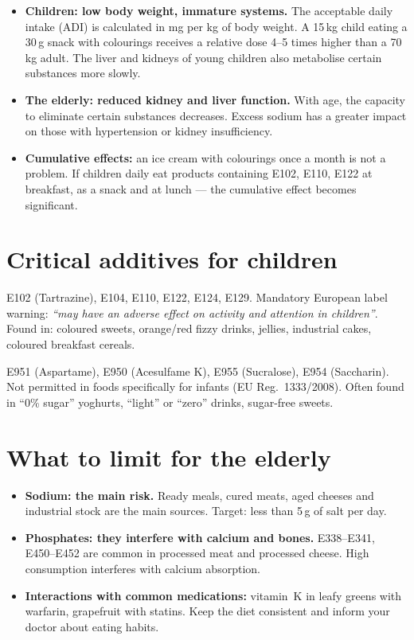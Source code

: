 \documentclass[a5paper,12pt,oneside,openany]{book}
\newcommand{\boxyellow}[2]{%
  \begin{tcolorbox}[boxbase,
    colback=warnyellow!12!white, colframe=warnyellow!80!black, title={#1}]
  #2\end{tcolorbox}}
\newcommand{\boxred}[2]{%
  \begin{tcolorbox}[boxbase,
    colback=warnred!8!white, colframe=warnred, title={#1}]
  #2\end{tcolorbox}}
\begin{document}
\begin{itemize}
  \item \textbf{Children: low body weight, immature systems.} The
    acceptable daily intake (ADI) is calculated in mg per kg of body
    weight. A 15\,kg child eating a 30\,g snack with colourings receives
    a relative dose 4--5 times higher than a 70\,kg adult. The liver and
    kidneys of young children also metabolise certain substances more
    slowly.
  \item \textbf{The elderly: reduced kidney and liver function.} With
    age, the capacity to eliminate certain substances decreases. Excess
    sodium has a greater impact on those with hypertension or kidney
    insufficiency.
  \item \textbf{Cumulative effects:} an ice cream with colourings once
    a month is not a problem. If children daily eat products containing
    E102, E110, E122 at breakfast, as a snack and at lunch --- the
    cumulative effect becomes significant.
\end{itemize}

\section{Critical additives for children}

\boxred{Azo dyes --- avoid with children}{E102 (Tartrazine), E104,
E110, E122, E124, E129. Mandatory European label warning: \emph{``may
have an adverse effect on activity and attention in children''}. Found in:
coloured sweets, orange/red fizzy drinks, jellies, industrial cakes,
coloured breakfast cereals.}

\boxyellow{Intense sweeteners --- not approved for young children}{E951
(Aspartame), E950 (Acesulfame K), E955 (Sucralose), E954 (Saccharin).
Not permitted in foods specifically for infants (EU Reg.~1333/2008).
Often found in ``0\% sugar'' yoghurts, ``light'' or ``zero'' drinks,
sugar-free sweets.}

\section{What to limit for the elderly}

\begin{itemize}
  \item \textbf{Sodium: the main risk.} Ready meals, cured meats, aged
    cheeses and industrial stock are the main sources. Target: less than
    5\,g of salt per day.
  \item \textbf{Phosphates: they interfere with calcium and bones.}
    E338--E341, E450--E452 are common in processed meat and processed
    cheese. High consumption interferes with calcium absorption.
  \item \textbf{Interactions with common medications:} vitamin~K in leafy
    greens with warfarin, grapefruit with statins. Keep the diet consistent
    and inform your doctor about eating habits.
\end{itemize}
\end{document}
